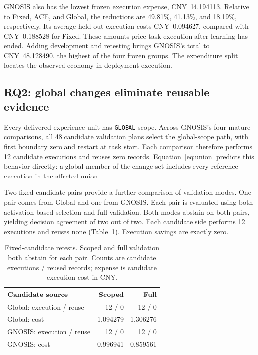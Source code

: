 \documentclass{ecai}
\newcommand{\Global}{\texttt{GLOBAL}}
\begin{document}
GNOSIS also has the lowest frozen execution expense, CNY~14.194113. Relative to Fixed, ACE, and Global, the reductions are 49.81\%, 41.13\%, and 18.19\%, respectively. Its average held-out execution costs CNY~0.094627, compared with CNY~0.188528 for Fixed. These amounts price task execution after learning has ended. Adding development and retesting brings GNOSIS's total to CNY~48.128490, the highest of the four frozen groups. The expenditure split locates the observed economy in deployment execution.

\subsection{RQ2: global changes eliminate reusable evidence}
\label{sec:scope-results}

Every delivered experience unit has \Global{} scope. Across GNOSIS's four mature comparisons, all 48 candidate validation plans select the global-scope path, with first boundary zero and restart at task start. Each comparison therefore performs 12 candidate executions and reuses zero records. Equation~\eqref{eq:union} predicts this behavior directly: a global member of the change set includes every reference execution in the affected union.

Two fixed candidate pairs provide a further comparison of validation modes. One pair comes from Global and one from GNOSIS. Each pair is evaluated using both activation-based selection and full validation. Both modes abstain on both pairs, yielding decision agreement of two out of two. Each candidate side performs 12 executions and reuses none (Table~\ref{tab:retest}). Execution savings are exactly zero.

\begin{table}[t]
\centering
\caption{Fixed-candidate retests. Scoped and full validation both abstain for each pair. Counts are candidate executions / reused records; expense is candidate execution cost in CNY.}
\label{tab:retest}
\small
\begin{tabular}{lrr}
\toprule
Candidate source & Scoped & Full\\
\midrule
Global: execution / reuse & 12 / 0 & 12 / 0\\
Global: cost & 1.094279 & 1.306276\\
GNOSIS: execution / reuse & 12 / 0 & 12 / 0\\
GNOSIS: cost & 0.996941 & 0.859561\\
\bottomrule
\end{tabular}
\end{table}
\end{document}
